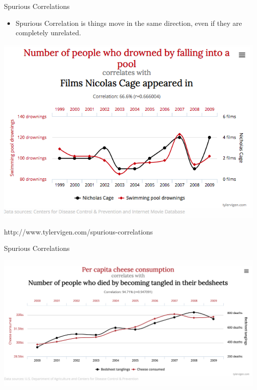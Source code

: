 \documentclass{beamer}
\begin{document}
\begin{frame}{Spurious Correlations}
	
	\begin{itemize}
		\item \alert{Spurious Correlation} is things move in the same direction, even if they are completely unrelated.
	\end{itemize}
	
	\begin{center}
		\includegraphics[width=\textwidth]{spcorr1}
	\end{center}
	{\footnotesize http://www.tylervigen.com/spurious-correlations}
	
\end{frame}

\begin{frame}{Spurious Correlations}
	\begin{center}
		\includegraphics[width=\textwidth]{spurious2}
	\end{center}
\end{frame}
\end{document}
